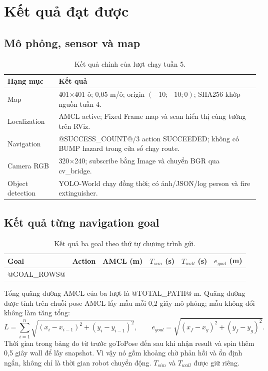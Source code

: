 \documentclass[a4paper,11pt]{article}
\begin{document}
\section{Kết quả đạt được}
\subsection{Mô phỏng, sensor và map}
\begin{table}[H]\centering\small
\begin{tabular}{@{}p{3.2cm}p{12.5cm}@{}}\toprule
Hạng mục & Kết quả\\\midrule
Map & 401$\times$401 ô; 0,05 m/ô; origin $(-10;-10;0)$; SHA256 khớp nguồn tuần 4.\\
Localization & AMCL active; Fixed Frame map và scan hiển thị cùng tường trên RViz.\\
Navigation & @SUCCESS_COUNT@/3 action SUCCEEDED; không có BUMP hazard trong cửa sổ chạy route.\\
Camera RGB & 320$\times$240; subscribe bằng Image và chuyển BGR qua cv\_bridge.\\
Object detection & YOLO-World chạy đồng thời; có ảnh/JSON/log person và fire extinguisher.\\\bottomrule
\end{tabular}
\caption{Kết quả chính của lượt chạy tuần 5.}
\end{table}

\subsection{Kết quả từng navigation goal}
\begin{table}[H]\centering\small
\begin{tabular}{@{}llrrrr@{}}\toprule
Goal & Action & AMCL (m) & $T_{sim}$ (s) & $T_{wall}$ (s) & $e_{goal}$ (m)\\\midrule
@GOAL_ROWS@
\bottomrule\end{tabular}
\caption{Kết quả ba goal theo thứ tự chương trình gửi.}
\end{table}

Tổng quãng đường AMCL của ba lượt là @TOTAL_PATH@ m. Quãng đường được tính
trên chuỗi pose AMCL lấy mẫu mỗi 0,2 giây mô phỏng; mẫu không đổi không làm tăng tổng:
\[
L=\sum_{i=1}^{n}\sqrt{(x_i-x_{i-1})^2+(y_i-y_{i-1})^2},\qquad
e_{goal}=\sqrt{(x_f-x_g)^2+(y_f-y_g)^2}.
\]
Thời gian trong bảng đo từ trước goToPose đến sau khi nhận result và spin thêm
0,5 giây wall để lấy snapshot. Vì vậy nó gồm khoảng chờ phản hồi và ổn định ngắn,
không chỉ là thời gian robot chuyển động. $T_{sim}$ và $T_{wall}$ được giữ riêng.
\end{document}
